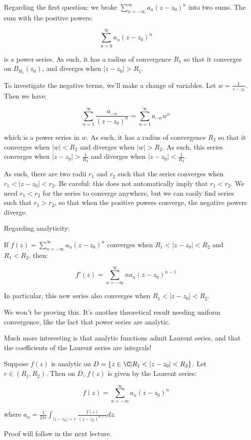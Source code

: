 Regarding the first question: we broke $\sum_{n = -\infty}^\infty a_n(z-z_0)^n$ into two sums. The sum with the positive powers:

$$\sum_{n = 0}^\infty a_n(z-z_0)^n$$

\noin is a power series. As such, it has a radius of convergence $R_1$ so that it converges on $B_{R_1}(z_0)$, and diverges when $|z-z_0| > R_1$.

To investigate the negative terms, we'll make a change of variables. Let $w = \frac{1}{z-z_0}$. Then we have:

$$\sum_{n = 1}^\infty \frac{a_{-n}}{(z-z_0)^n} = \sum_{n = 1}^\infty a_{-n}w^n$$

\noin which is a power series in $w$. As such, it has a radius of convergence $R_2$ so that it converges when $|w| < R_2$ and diverges when $|w| > R_2$. As such, this series converges when $|z-z_0| > \frac{1}{R_2}$ and diverges when $|z-z_0| < \frac{1}{R_2}$.

As such, there are two radii $r_1$ and $r_2$ such that the series converges when $r_1 < |z-z_0| < r_2$. Be careful: this does not automatically imply that $r_1 < r_2$. We need $r_1 < r_2$ for the series to converge anywhere, but we can easily find series such that $r_1 > r_2$, so that when the positive powers converge, the negative powers diverge.

Regarding analyticity:

\begin{thmbo}{}{} If $f(z) = \sum_{n = -\infty}^\infty a_n(z-z_0)^n$ converges when $R_1 < |z-z_0| < R_2$ and $R_1 < R_2$, then:

$$f'(z) = \sum_{n = -\infty}^\infty na_n(z-z_0)^{n-1}$$

\noin In particular, this new series also converges when $R_1 < |z-z_0| <R_2$.
\end{thmbo}

We won't be proving this. It's another theoretical result needing uniform convergence, like the fact that power series are analytic.

Much more interesting is that analytic functions admit Laurent series, and that the coefficients of the Laurent series are integrals! 

\begin{thmbo}{}{} Suppose $f(z)$ is analytic on $D = \{z\in\C|R_1 < |z-z_0| < R_2\}$. Let $r\in (R_1,R_2)$. Then on $D$, $f(z)$ is given by the Laurent series:

$$f(z) = \sum_{n = -\infty}^\infty a_n(z-z_0)^n$$

\noin where $a_n = \frac{1}{2\pi i}\int_{|z-z_0|=r} \frac{f(z)}{(z-z_0)^{n+1}}dz$.
\end{thmbo}

Proof will follow in the next lecture.